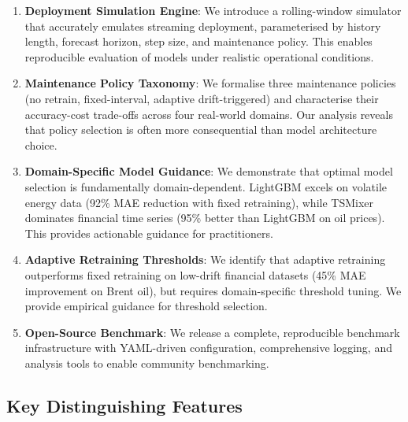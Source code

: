 \documentclass[conference]{IEEEtran}
\begin{document}
\begin{enumerate}
	\item \textbf{Deployment Simulation Engine}: We introduce a rolling-window simulator that accurately emulates streaming deployment, parameterised by history length, forecast horizon, step size, and maintenance policy. This enables reproducible evaluation of models under realistic operational conditions.

	\item \textbf{Maintenance Policy Taxonomy}: We formalise three maintenance policies (no retrain, fixed-interval, adaptive drift-triggered) and characterise their accuracy-cost trade-offs across four real-world domains. Our analysis reveals that policy selection is often more consequential than model architecture choice.

	\item \textbf{Domain-Specific Model Guidance}: We demonstrate that optimal model selection is fundamentally domain-dependent. LightGBM excels on volatile energy data (92\% MAE reduction with fixed retraining), while TSMixer dominates financial time series (95\% better than LightGBM on oil prices). This provides actionable guidance for practitioners.

	\item \textbf{Adaptive Retraining Thresholds}: We identify that adaptive retraining outperforms fixed retraining on low-drift financial datasets (45\% MAE improvement on Brent oil), but requires domain-specific threshold tuning. We provide empirical guidance for threshold selection.

	\item \textbf{Open-Source Benchmark}: We release a complete, reproducible benchmark infrastructure with YAML-driven configuration, comprehensive logging, and analysis tools to enable community benchmarking.
\end{enumerate}

\subsection{Key Distinguishing Features}
\end{document}
